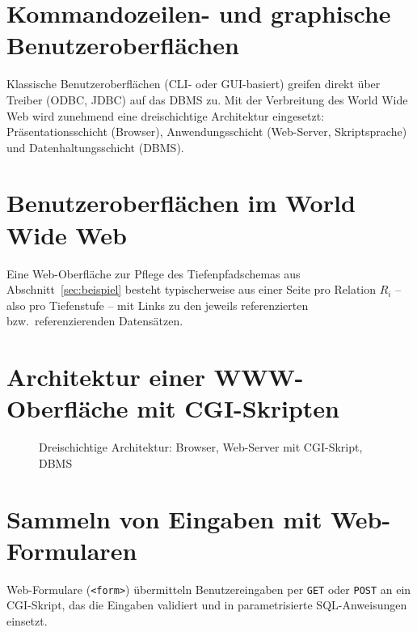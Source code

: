 ﻿\documentclass[a4paper,12pt]{report}
\theoremstyle{definition}
\theoremstyle{remark}
\begin{document}
\section{Kommandozeilen- und graphische Benutzeroberflächen}

Klassische Benutzeroberflächen (CLI- oder GUI-basiert) greifen direkt
über Treiber (ODBC, JDBC) auf das DBMS zu. Mit der Verbreitung des
World Wide Web wird zunehmend eine dreischichtige Architektur
eingesetzt: Präsentationsschicht (Browser), Anwendungsschicht
(Web-Server, Skriptsprache) und Datenhaltungsschicht (DBMS).

\section{Benutzeroberflächen im World Wide Web}

Eine Web-Oberfläche zur Pflege des Tiefenpfadschemas aus
Abschnitt~\ref{sec:beispiel} besteht typischerweise aus
einer Seite pro Relation $R_i$ -- also pro Tiefenstufe -- mit Links zu
den jeweils referenzierten bzw.\ referenzierenden Datensätzen.

\section{Architektur einer WWW-Oberfläche mit CGI-Skripten}

\begin{figure}[H]
\centering
{}
\caption{Dreischichtige Architektur: Browser, Web-Server mit CGI-Skript, DBMS}
\end{figure}

\section{Sammeln von Eingaben mit Web-Formularen}

Web-Formulare (\texttt{<form>}) übermitteln Benutzereingaben per
\texttt{GET} oder \texttt{POST} an ein CGI-Skript, das die Eingaben
validiert und in parametrisierte SQL-Anweisungen einsetzt.
\end{document}
